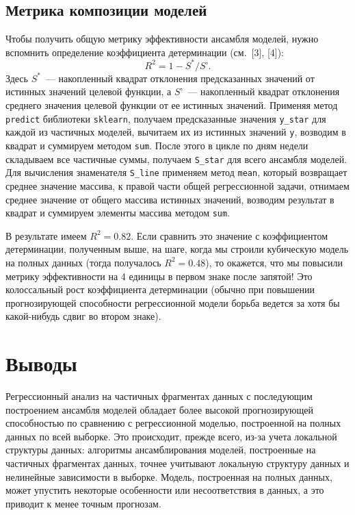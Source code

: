 \documentclass[a4paper,12pt]{article}
\begin{document}
\subsection{Метрика композиции моделей}

Чтобы получить общую метрику эффективности ансамбля моделей, нужно вспомнить определение коэффициента детерминации (см. [3], [4]):
$$
R^2 = 1 - S^*/ S’.
$$
Здесь $S^*$ — накопленный квадрат отклонения предсказанных значений от истинных значений целевой функции, а $S’$ — накопленный квадрат отклонения среднего значения целевой функции от ее истинных значений. Применяя метод \texttt{predict}  библиотеки \texttt{sklearn}, получаем предсказанные значения \texttt{y\_star} для каждой из частичных моделей, вычитаем их из истинных значений \texttt{y}, возводим в квадрат и суммируем методом \texttt{sum}. После этого в цикле по дням недели складываем все частичные суммы, получаем \texttt{S\_star} для всего ансамбля моделей. Для вычисления знаменателя \texttt{S\_line} применяем метод \texttt{mean}, который возвращает среднее значение массива, к правой части общей регрессионной задачи, отнимаем среднее значение от общего массива истинных значений, возводим результат в квадрат и суммируем элементы массива методом \texttt{sum}.

В результате имеем $R^2 = 0.82$. Если сравнить это значение с коэффициентом детерминации, полученным выше, на шаге, когда мы строили кубическую модель на полных данных (тогда получалось $R^2 = 0.48$), то окажется, что мы повысили метрику эффективности на 4 единицы в первом знаке после запятой! Это колоссальный рост коэффициента детерминации (обычно при повышении прогнозирующей способности регрессионной модели борьба ведется за хотя бы какой-нибудь сдвиг во втором знаке).

\section{Выводы}
Регрессионный анализ на частичных фрагментах данных с последующим построением ансамбля моделей обладает более высокой прогнозирующей способностью по сравнению с регрессионной моделью, построенной на полных данных по всей выборке. 
Это происходит, прежде всего, из-за учета локальной структуры данных: алгоритмы ансамблирования моделей, построенные на частичных фрагментах данных, точнее  учитывают локальную структуру данных и нелинейные зависимости в выборке. Модель, построенная на полных данных, может упустить некоторые особенности или несоответствия в данных, а это приводит к менее точным прогнозам.
\end{document}
